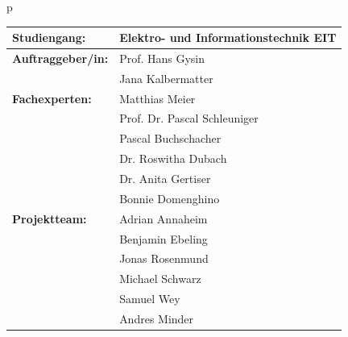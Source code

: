 \begin{center}
\begin{tabular}{p{\textwidth}}
\\

\begin{center}
\begin{tabular}{ll}
\toprule 
\textbf{Studiengang:} 		& Elektro- und Informationstechnik EIT \\
\hline
\textbf{Auftraggeber/in:} 	& Prof. Hans Gysin\\
							& Jana Kalbermatter\\
\hline
\textbf{Fachexperten:} 		& Matthias Meier \\
							& Prof. Dr. Pascal Schleuniger \\
							& Pascal Buchschacher \\
							& Dr. Roswitha Dubach \\
							& Dr. Anita Gertiser \\
							& Bonnie Domenghino \\
\hline
\textbf{Projektteam:} & Adrian Annaheim \\ 
							& Benjamin Ebeling \\ 
 							& Jonas Rosenmund\\ 
 							& Michael Schwarz  \\ 
 							& Samuel Wey \\ 
 							& Andres Minder \\ 
\bottomrule
\end{tabular}
\end{center}

\end{tabular}
\end{center}